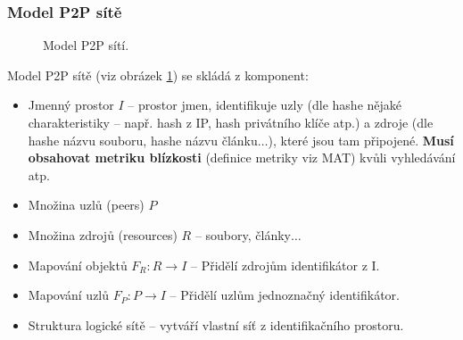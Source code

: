 \documentclass[11pt,a4paper]{article}
\begin{document}
\subsubsection{Model P2P sítě}
\begin{figure}[ht!]
\begin{center}
\caption{Model P2P sítí.}
\label{p2p_model}
\end{center}
\end{figure}
Model P2P sítě (viz obrázek \ref{p2p_model}) se skládá z komponent:
\begin{itemize}
\item Jmenný prostor $I$ -- prostor jmen, identifikuje uzly (dle hashe nějaké charakteristiky -- např. hash z IP, hash privátního klíče atp.) a zdroje (dle hashe názvu souboru, hashe názvu článku$\ldots$), které jsou tam připojené. \textbf{Musí obsahovat metriku blízkosti} (definice metriky viz MAT) kvůli vyhledávání atp.
\item Množina uzlů (peers) $P$
\item Množina zdrojů (resources) $R$ -- soubory, články$\ldots$
\item Mapování objektů $F_R : R \rightarrow I$ -- Přidělí zdrojům identifikátor z I.
\item Mapování uzlů $F_P : P \rightarrow I$ -- Přidělí uzlům jednoznačný identifikátor.
\item Struktura logické sítě -- vytváří vlastní síť z identifikačního prostoru.
\end{itemize}
\end{document}
